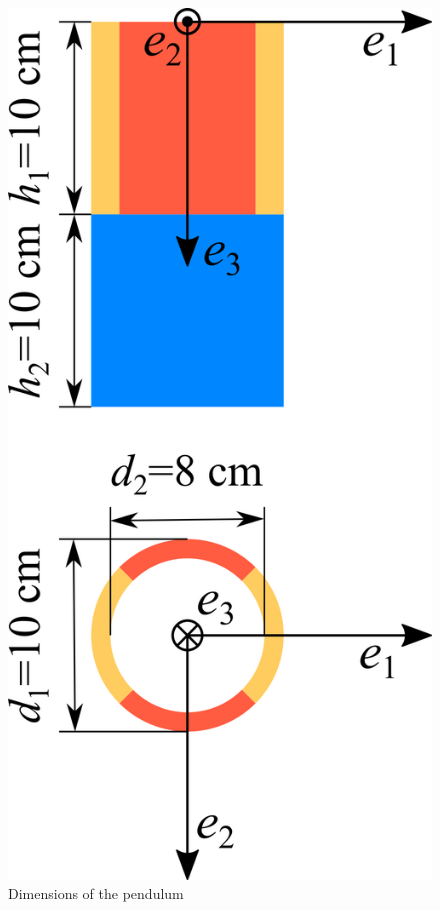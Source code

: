 \documentclass[10pt]{article}
\begin{document}
\begin{figure}
	\centering
	\includegraphics{pendulum.png}
	\caption{Dimensions of the pendulum \label{fig:pendulum}}
\end{figure}
\end{document}
